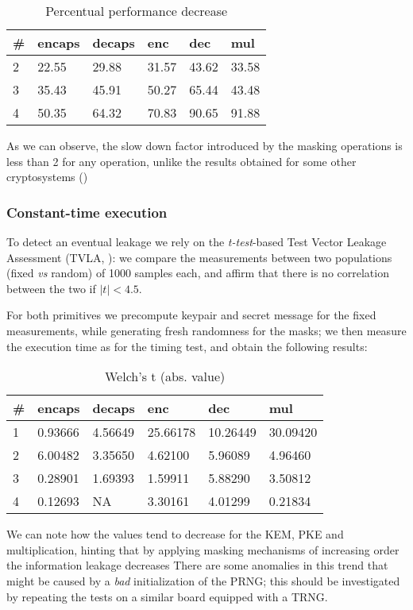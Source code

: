 \begin{table}
    \begin{tabular}{llllll}
        \# & encaps & decaps & enc & dec & mul \\ \hline
        2 & 22.55 & 29.88 & 31.57 & 43.62 & 33.58 \\
        3 & 35.43 & 45.91 & 50.27 & 65.44 & 43.48 \\
        4 & 50.35 & 64.32 & 70.83 & 90.65 & 91.88
    \end{tabular}
    \caption{Percentual performance decrease}
\end{table}
As we can observe, the slow down factor introduced by the masking operations is less than 2 for any operation, 
unlike the results obtained for some other cryptosystems (\cite{belaid:hal-02953167,cryptoeprint:2020:733,cryptoeprint:2021:483})

\subsubsection*{Constant-time execution}
To detect an eventual leakage we rely on the \textit{t-test}-based Test Vector Leakage Assessment (TVLA, \cite{schneider2015leakage}): 
we compare the measurements between two populations (fixed \textit{vs} random) of 1000 samples each, and affirm that there is no correlation
between the two if $|t| < 4.5$.

For both primitives we precompute keypair and secret message for the fixed measurements, while generating fresh randomness for the masks; we then measure 
the execution time as for the timing test, and obtain the following results:

\begin{table}
    \begin{tabular}{llllll}
        \# & encaps & decaps & enc & dec & mul \\ \hline
        1 & 0.93666 & 4.56649 & 25.66178 & 10.26449 & 30.09420 \\
        2 & 6.00482 & 3.35650 & 4.62100 & 5.96089 & 4.96460 \\
        3 & 0.28901 & 1.69393 & 1.59911 & 5.88290 & 3.50812 \\
        4 & 0.12693 & NA & 3.30161 & 4.01299 & 0.21834
    \end{tabular}
    \caption{Welch's t (abs. value)}
\end{table}

We can note how the values tend to decrease for the KEM, PKE and multiplication, hinting that
by applying masking mechanisms of increasing order the information leakage decreases There are some anomalies in this trend
that might be caused by a \textit{bad} initialization of the PRNG; this should be investigated by repeating the tests on a 
similar board equipped with a TRNG.




